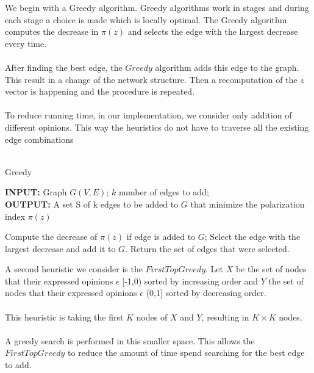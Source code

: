 We begin with a Greedy algorithm. Greedy algorithms work in stages and during each stage a choice is made which is locally optimal.
The Greedy algorithm computes the decrease in $\pi(z)$ and selects the edge with the largest decrease every time.
\\
\\
After finding the best edge, the $Greedy$ algorithm adds this edge to the graph. This result in a change of the network structure.
Then a recomputation of the $z$ vector is happening and  the procedure is repeated.
\\
\\
To reduce running time, in our implementation, we consider only addition of different opinions. This way the heuristics do not have to traverse all the existing edge combinations
\\
\\
    		\begin{algorithm}[H]
		
			\caption{Greedy}
			\label{alg:greedyAlgo}
			
			\begin{flushleft}
        				\textbf{INPUT:} Graph $G(V, E)$; $k$ number of edges to add;
				\vspace{6pt} \\
        				\textbf{OUTPUT:} A set S of k edges to be added to $G$ that minimize the polarization \\
				 index $\pi(z)$
			\end{flushleft}
			
			\begin{algorithmic}[1]
						\STATE Compute the decrease of $\pi(z)$ if edge is added to $G$;
					\ENDFOR
					\STATE Select the edge with the largest decrease and add it to $G$.
				\ENDFOR
				\STATE Return the set of edges that were selected.
			\end{algorithmic}
		\end{algorithm}

\clearpage

\noindent A second heuristic we consider is the $FirstTopGreedy$. Let $X$ be the set of nodes that their expressed opinions $\epsilon$ [-1,0) sorted by increasing order and $Y$ the set of nodes that their expressed opinions $\epsilon$ (0,1] sorted by decreasing order. 
\\
\\
This heuristic is taking the first $K$ nodes of $X$ and $Y$, resulting in $K \times K$ nodes.
\\
\\
A greedy search is performed in this smaller space. This allows the $FirstTopGreedy$ to reduce the amount of time spend searching for the best edge to add.
\\

